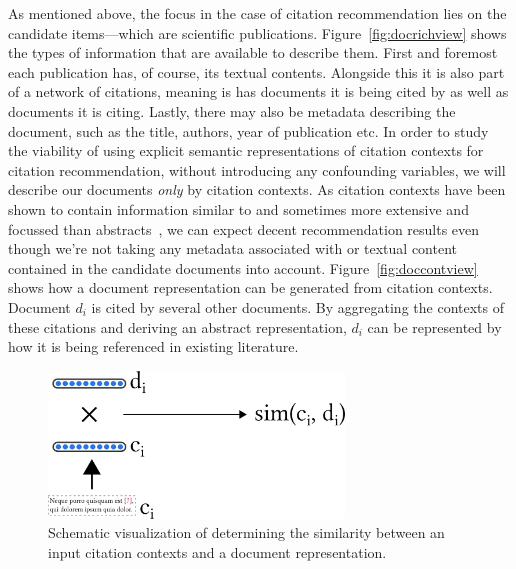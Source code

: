 As mentioned above, the focus in the case of citation recommendation lies on the candidate items---which are scientific publications. Figure~\ref{fig:docrichview} shows the types of information that are available to describe them. First and foremost each publication has, of course, its textual contents. Alongside this it is also part of a network of citations, meaning is has documents it is being cited by as well as documents it is citing. Lastly, there may also be metadata describing the document, such as the title, authors, year of publication etc. In order to study the viability of using explicit semantic representations of citation contexts for citation recommendation, without introducing any confounding variables, we will describe our documents \emph{only} by citation contexts. As citation contexts have been shown to contain information similar to and sometimes more extensive and focussed than abstracts~\cite{Elkiss2008}, we can expect decent recommendation results even though we're not taking any metadata associated with or textual content contained in the candidate documents into account. Figure~\ref{fig:doccontview} shows how a document representation can be generated from citation contexts. Document $d_i$ is cited by several other documents. By aggregating the contexts of these citations and deriving an abstract representation, $d_i$ can be represented by how it is being referenced in existing literature.

\begin{figure}[!b]
  \centering
    \includegraphics[width=0.7\textwidth]{figures/background/document_context_view_comparison.pdf}
  \caption{Schematic visualization of determining the similarity between an input citation contexts and a document representation.}
  \label{fig:doccomp}
\end{figure}

